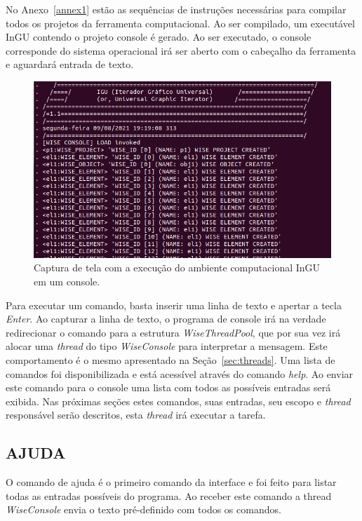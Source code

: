 No Anexo~\ref{annex1} estão as sequências de instruções necessárias para compilar todos os projetos da ferramenta computacional. Ao ser compilado, um executável InGU contendo o projeto console é gerado. Ao ser executado, o console corresponde do sistema operacional irá ser aberto com o cabeçalho da ferramenta e aguardará entrada de texto.

\begin{figure}[!htbp]
	\centering
	\includegraphics[scale=0.45]{Figures/InGU_console.png}
	\caption{Captura de tela com a execução do ambiente computacional InGU em um console.}
	\label{fig11:ajuda}
\end{figure}

Para executar um comando, basta inserir uma linha de texto e apertar a tecla \textit{Enter}.  Ao capturar a linha de texto, o programa de console irá na verdade redirecionar o comando para a estrutura \textit{WiseThreadPool}, que por sua vez irá alocar uma \textit{thread} do tipo \textit{WiseConsole} para interpretar a mensagem. Este comportamento é o mesmo apresentado na Seção~\ref{sec:threads}. Uma lista de comandos foi disponibilizada e está acessível através do comando \textit{help}. Ao enviar este comando para o console uma lista com todos as possíveis entradas será exibida. Nas próximas seções estes comandos, suas entradas, seu escopo e \textit{thread} responsável serão descritos, esta \textit{thread} irá executar a tarefa. 

\subsection{AJUDA}\label{sec:help}

O comando de ajuda é o primeiro comando da interface e foi feito para listar todas as entradas possíveis do programa. Ao receber este comando a thread \textit{WiseConsole} envia o texto pré-definido com todos os comandos.

